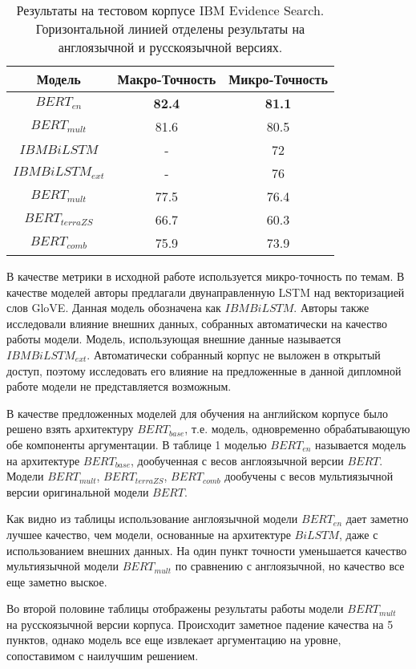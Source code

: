 \begin{table}[h!]
\centering
\begin{tabular}{|| c | c | c |} 
 \hline
 Модель & Макро-Точность & Микро-Точность \\ [0.5ex] 
 \hline
 $BERT_{en}$ & \textbf{82.4} & \textbf{81.1} \\ 
 $BERT_{mult}$ & 81.6 & 80.5 \\
 $IBM BiLSTM$ & - & 72 \\
 $IBM BiLSTM_{ext}$ & - & 76 \\ 
 \hline
 $BERT_{mult}$ & 77.5 & 76.4 \\
 $BERT_{terraZS}$ & 66.7 & 60.3 \\
 $BERT_{comb}$ & 75.9 & 73.9 \\
 \hline
\end{tabular}
\caption{Результаты на тестовом корпусе IBM Evidence Search. Горизонтальной линией отделены результаты на англоязычной и русскоязычной версиях.}
\label{table:1}
\end{table}

В качестве метрики в исходной работе используется микро-точность по темам. В качестве моделей авторы \cite{shnarch2018will} предлагали двунаправленную LSTM над векторизацией слов GloVE. Данная модель обозначена как $IBM BiLSTM$. Авторы также исследовали влияние внешних данных, собранных автоматически на качество работы модели. Модель, использующая внешние данные называется $IBM BiLSTM_{ext}$. Автоматически собранный корпус не выложен в открытый доступ, поэтому исследовать его влияние на предложенные в данной дипломной работе модели не представляется возможным.

В качестве предложенных моделей для обучения на английском корпусе было решено взять архитектуру $BERT_{base}$, т.е. модель, одновременно обрабатывающую обе компоненты аргументации. В таблице 1 моделью $BERT_{en}$ называется модель на архитектуре $BERT_{base}$, дообученная с весов англоязычной версии $BERT$. Модели $BERT_{mult}$, $BERT_{terraZS}$, $BERT_{comb}$ дообучены с весов мультиязычной версии оригинальной модели $BERT$.

Как видно из таблицы использование англоязычной модели $BERT_{en}$ дает заметно лучшее качество, чем модели, основанные на архитектуре $BiLSTM$, даже с использованием внешних данных. На один пункт точности уменьшается качество мультиязычной модели $BERT_{mult}$ по сравнению с англоязычной, но качество все еще заметно выское.

Во второй половине таблицы отображены результаты работы модели $BERT_{mult}$ на русскоязычной версии корпуса. Происходит заметное падение качества на 5 пунктов, однако модель все еще извлекает аргументацию на уровне, сопоставимом с наилучшим решением.

